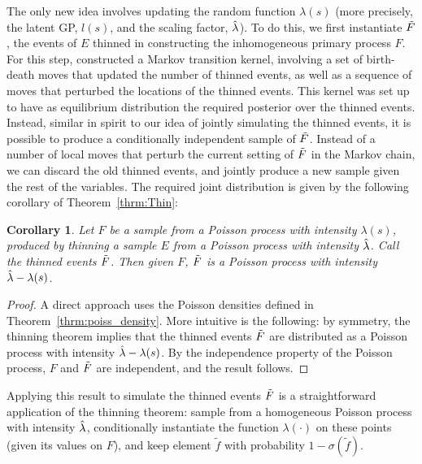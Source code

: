 \documentclass{statsoc}
\newtheorem{coro}[defn]{Corollary}
\begin{document}
The only new idea 
involves updating the random function $\lambda(s)$ (more precisely, the latent GP, $l(s)$, and the scaling factor, $\hat{\lambda}$). 
To do this, we first instantiate $\tilde{F}$, the events of $E$ thinned in constructing the inhomogeneous primary process $F$.
For this step, \citet{adams-murray-mackay-2009b} constructed a Markov transition kernel, involving a set of birth-death moves that updated the number of thinned 
events, as
well as a sequence of moves that perturbed the locations of the thinned events. This kernel was set up to have as equilibrium distribution the required
posterior over the thinned events. 
Instead, similar in spirit to our idea of jointly simulating the thinned \matern events, it is possible to produce a conditionally independent sample of $\tilde{F}$.
Instead of a number of local moves that perturb the current setting of $\tilde{F}$ in the Markov chain, we can discard the old thinned
events, and jointly produce a new sample given the rest of the variables. 
The required joint distribution is given by the following corollary of Theorem~\ref{thrm:Thin}:
\begin{coro} \label{prop:thin_post} Let $F$ be a sample from a Poisson process with intensity $\lambda(s)$, produced
by thinning a sample $E$ from a Poisson process with intensity $\hat{\lambda}$. Call the thinned events $\tilde{F}$. Then given $F$, $\tilde{F}$ is a 
Poisson process with intensity $\hat{\lambda} - \lambda(s)$.
\end{coro}
\begin{proof}
A direct approach uses the Poisson densities defined in Theorem~\ref{thrm:poiss_density}. More intuitive is the following: by symmetry, the
thinning theorem implies that the thinned events $\tilde{F}$ are distributed as a Poisson process with intensity $\hat{\lambda} - \lambda(s)$. By the
independence property of the Poisson process, $F$ and $\tilde{F}$ are independent, and the result follows.
\end{proof}
Applying this result to simulate the thinned events $\tilde{F}$ is a straightforward application of the thinning theorem: 
sample from a homogeneous Poisson process with intensity $\hat{\lambda}$, conditionally instantiate the function $\lambda(\cdot)$ on these points (given its values on $F$), 
and keep element $\tilde{f}$ with probability $1 - \sigma(\tilde{f})$. 
\end{document}
